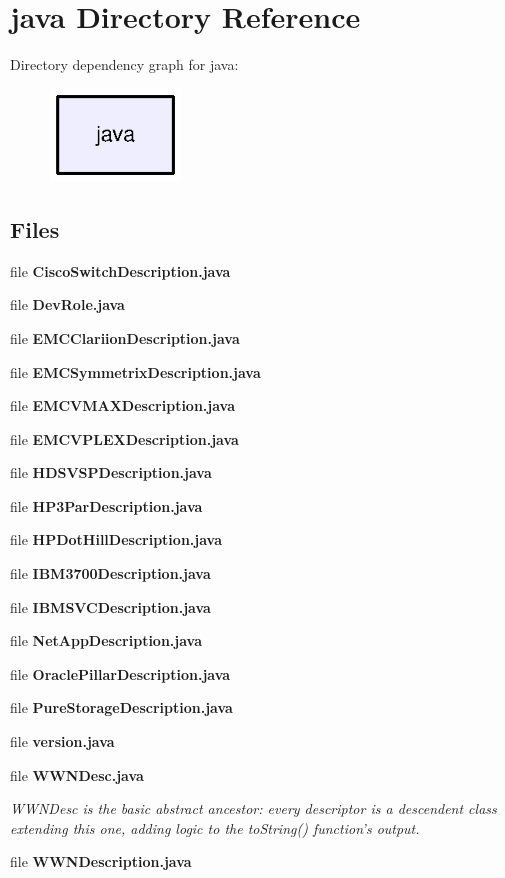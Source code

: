 \section{java Directory Reference}
\label{dir_93c6ba7fb77bae0709fae89c9c13b44a}
Directory dependency graph for java\+:\nopagebreak
\begin{figure}[H]
\begin{center}
\leavevmode
\includegraphics[width=98pt]{dir_93c6ba7fb77bae0709fae89c9c13b44a_dep}
\end{center}
\end{figure}
\subsection*{Files}
\begin{DoxyCompactItemize}
\item 
file {\bfseries Cisco\+Switch\+Description.\+java}
\item 
file {\bf Dev\+Role.\+java}
\item 
file {\bf E\+M\+C\+Clariion\+Description.\+java}
\item 
file {\bf E\+M\+C\+Symmetrix\+Description.\+java}
\item 
file {\bf E\+M\+C\+V\+M\+A\+X\+Description.\+java}
\item 
file {\bf E\+M\+C\+V\+P\+L\+E\+X\+Description.\+java}
\item 
file {\bf H\+D\+S\+V\+S\+P\+Description.\+java}
\item 
file {\bf H\+P3\+Par\+Description.\+java}
\item 
file {\bf H\+P\+Dot\+Hill\+Description.\+java}
\item 
file {\bf I\+B\+M3700\+Description.\+java}
\item 
file {\bf I\+B\+M\+S\+V\+C\+Description.\+java}
\item 
file {\bf Net\+App\+Description.\+java}
\item 
file {\bf Oracle\+Pillar\+Description.\+java}
\item 
file {\bfseries Pure\+Storage\+Description.\+java}
\item 
file {\bf version.\+java}
\item 
file {\bf W\+W\+N\+Desc.\+java}
\begin{DoxyCompactList}\small\item\em W\+W\+N\+Desc is the basic abstract ancestor\+: every descriptor is a descendent class extending this one, adding logic to the to\+String() function's output. \end{DoxyCompactList}\item 
file {\bf W\+W\+N\+Description.\+java}
\end{DoxyCompactItemize}
